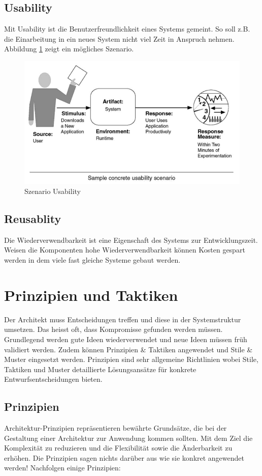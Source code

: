 \subsection{Usability}

Mit Usability ist die Benutzerfreundlichkeit eines Systems gemeint. So soll z.B. die Einarbeitung in ein neues System nicht viel Zeit in Anspruch nehmen. Abbildung \ref{fig:usability} zeigt ein mögliches Szenario.

\begin{figure}[h!]
\centering
\includegraphics[width=0.7\linewidth]{fig/usability}
\caption{Szenario Usability}
\label{fig:usability}
\end{figure}

\subsection{Reusablity}

Die Wiederverwendbarkeit ist eine Eigenschaft des Systems zur Entwicklungszeit. Weisen die Komponenten hohe Wiederverwendbarkeit können Kosten gespart werden in dem viele fast gleiche Systeme gebaut werden.

\section{Prinzipien und Taktiken}
Der Architekt muss Entscheidungen treffen und diese in der Systemstruktur umsetzen. Das heisst oft, dass Kompromisse gefunden werden müssen. Grundlegend werden gute Ideen wiederverwendet und neue Ideen müssen früh validiert werden. Zudem können Prinzipien \& Taktiken angewendet und Stile \& Muster eingesetzt werden. Prinzipien sind sehr allgemeine Richtlinien wobei Stile, Taktiken und Muster detaillierte Lösungsansätze für konkrete Entwurfsentscheidungen bieten.

\subsection{Prinzipien}
Architektur-Prinzipien repräsentieren bewährte Grundsätze, die bei der Gestaltung einer Architektur zur Anwendung kommen sollten. Mit dem Ziel die Komplexität zu reduzieren und die Flexibilität sowie die Änderbarkeit zu erhöhen. Die Prinzipien sagen nichts darüber aus wie sie konkret angewendet werden! Nachfolgen einige Prinzipien:

